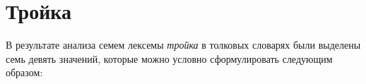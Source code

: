 \documentclass[LI,VKR]{HSEUniversity}
\begin{document}
%
%
%

\section{Тройка}

В результате анализа семем лексемы \textit{тройка} в толковых словарях были выделены семь девять значений,
которые можно условно сформулировать следующим образом:
\end{document}
